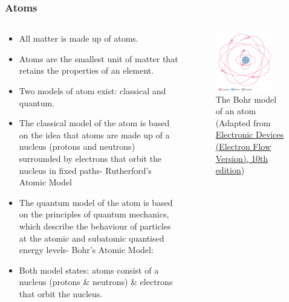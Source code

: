 \begin{frame}
	\frametitle{Atoms}
	\begin{columns}
		\begin{column}{0.65\textwidth}
          \begin{itemize}
            \item All matter is made up of atoms.
            \item Atoms are the smallest unit of matter that retains the properties of an element.
            \item Two models of atom exist: classical and quantum.
            \item The classical model of the atom is based on the idea that atoms are made up of a nucleus (protons and neutrons) surrounded by electrons that orbit the nucleus in fixed paths- Rutherford's Atomic Model
            \item The quantum model of the atom is based on the principles of quantum mechanics, which describe the behaviour of particles at the atomic and subatomic quantised energy levels- Bohr's Atomic Model:
            \item Both model states: atoms consist of a nucleus (protons \& neutrons) \& electrons that orbit the nucleus.
          \end{itemize}
		\end{column}
        \hfill
		\begin{column}{0.35\textwidth}
            \begin{figure}
                \centering
                \includegraphics[width=0.8\textwidth]{fig/lec02/Atom_model.png}
                \caption{The Bohr model of an atom (Adapted from \href{https://www.pearson.com/en-us/subject-catalog/p/electronic-devices-electron-flow-version/P200000001048/9780137556755}{Electronic Devices (Electron Flow Version), 10th edition})}
            \end{figure}
		\end{column}
		\end{columns}
\end{frame}


